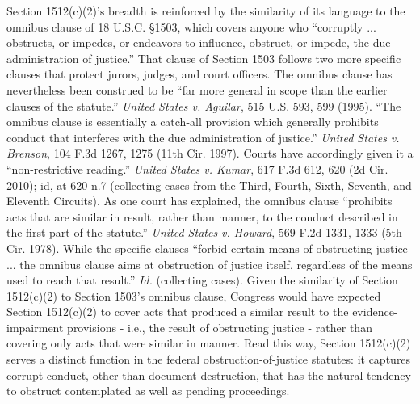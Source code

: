 Section 1512(c)(2)’s breadth is reinforced by the similarity of its language to the omnibus clause of 18 U.S.C. \S 1503, which covers anyone who “corruptly ... obstructs, or impedes, or endeavors to influence, obstruct, or impede, the due administration of justice.” That clause of Section 1503 follows two more specific clauses that protect jurors, judges, and court officers.
The omnibus clause has nevertheless been construed to be “far more general in scope than the earlier clauses of the statute.”
\textit{United States v. Aguilar}, 515 U.S. 593, 599 (1995).
“The omnibus clause is essentially a catch-all provision which generally prohibits conduct that interferes with the due administration of justice.”
\textit{United States v. Brenson}, 104 F.3d 1267, 1275 (11th Cir. 1997).
Courts have accordingly given it a “non-restrictive reading.”
\textit{United States v. Kumar}, 617 F.3d 612, 620 (2d Cir. 2010); id, at 620 n.7 (collecting cases from the Third, Fourth, Sixth, Seventh, and Eleventh Circuits).
As one court has explained, the omnibus clause “prohibits acts that are similar in result, rather than manner, to the conduct described in the first part of the statute.”
\textit{United States v. Howard}, 569 F.2d 1331, 1333 (5th Cir. 1978).
While the specific clauses “forbid certain means of obstructing justice ... the omnibus clause aims at obstruction of justice itself, regardless of the means used to reach that result.”
\textit{Id.} (collecting cases).
Given the similarity of Section 1512(c)(2) to Section 1503’s omnibus clause, Congress would have expected Section 1512(c)(2) to cover acts that produced a similar result to the evidence-impairment provisions - i.e., the result of obstructing justice - rather than covering only acts that were similar in manner.
Read this way, Section 1512(c)(2) serves a distinct function in the federal obstruction-of-justice statutes: it captures corrupt conduct, other than document destruction, that has the natural tendency to obstruct contemplated as well as pending proceedings.

